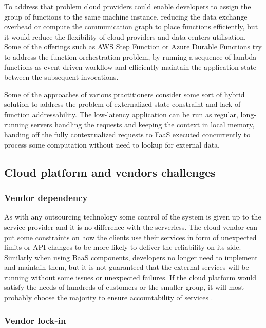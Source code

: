 To address that problem cloud providers could enable developers to assign the group of functions to the same machine instance, reducing the data exchange overhead or compute the communication graph to place functions efficiently, but it would reduce the flexibility of cloud providers and data centers utilisation. Some of the offerings such as AWS Step Function or Azure Durable Functions try to address the function orchestration problem, by running a sequence of lambda functions as event-driven workflow and efficiently maintain the application state between the subsequent invocations.

Some of the approaches of various practitioners consider some sort of hybrid solution to address the problem of externalized state constraint and lack of function addressability. The low-latency application can be run as regular, long-running servers handling the requests and keeping the context in local memory, handing off the fully contextualized requests to FaaS executed concurrently to process some computation without need to lookup for external data.

\subsection{Cloud platform and vendors challenges}

\subsubsection*{Vendor dependency}

As with any outsourcing technology some control of the system is given up to the service provider and it is no difference with the serverless. The cloud vendor can put some constraints on how the clients use their services in form of unexpected limits or API changes to be more likely to deliver the reliability on its side. Similarly when using BaaS components, developers no longer need to implement and maintain them, but it is not guaranteed that the external services will be running without some issues or unexpected failures. If the cloud platform would satisfy the needs of hundreds of customers or the smaller group, it will most probably choose the majority to ensure accountability of services \cite{MartinFowlerServerless}.

\subsubsection*{Vendor lock-in}

